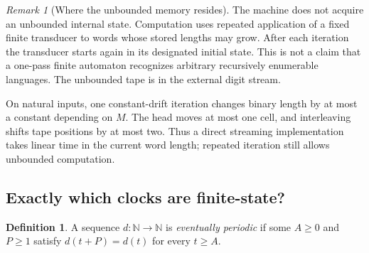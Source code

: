 \documentclass[11pt,letterpaper]{article}
\numberwithin{equation}{section}
\theoremstyle{definition}
\newtheorem{definition}[theorem]{Definition}
\theoremstyle{remark}
\newtheorem{remark}[theorem]{Remark}
\newcommand{\N}{\mathbb N}
\begin{document}
\begin{remark}[Where the unbounded memory resides]
The machine does not acquire an unbounded internal state. Computation
uses repeated application of a fixed finite transducer to words whose
stored lengths may grow. After each iteration the transducer starts again
in its designated initial state. This is not a claim that a one-pass
finite automaton recognizes arbitrary recursively enumerable languages.
The unbounded tape is in the external digit stream.
\end{remark}

On natural inputs, one constant-drift iteration changes binary length by
at most a constant depending on $M$. The head moves at most one cell, and
interleaving shifts tape positions by at most two. Thus a direct streaming
implementation takes linear time in the current word length; repeated
iteration still allows unbounded computation.

\subsection{Exactly which clocks are finite-state?}
\begin{definition}
A sequence $d\colon\N\to\N$ is \emph{eventually periodic} if some
$A\ge0$ and $P\ge1$ satisfy $d(t+P)=d(t)$ for every $t\ge A$.
\end{definition}
\end{document}
